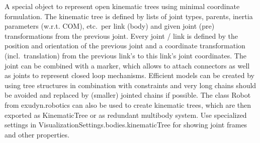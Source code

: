 \ei

%
\newpage


\label{sec:item:ObjectKinematicTree}
A special object to represent open kinematic trees using minimal coordinate formulation. The kinematic tree is defined by lists of joint types, parents, inertia parameters (w.r.t. COM), etc.\ per link (body) and given joint (pre) transformations from the previous joint. Every joint / link is defined by the position and orientation of the previous joint and a coordinate transformation (incl.\ translation) from the previous link's to this link's joint coordinates. The joint can be combined with a marker, which allows to attach connectors as well as joints to represent closed loop mechanisms. Efficient models can be created by using tree structures in combination with constraints and very long chains should be avoided and replaced by (smaller) jointed chains if possible. The class Robot from exudyn.robotics can also be used to create kinematic trees, which are then exported as KinematicTree or as redundant multibody system. Use specialized settings in VisualizationSettings.bodies.kinematicTree for showing joint frames and other properties.
\vspace{12pt}\\

